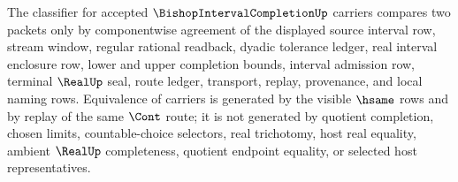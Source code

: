 \begin{definition}
\label{def:bishop-interval-completion-classifier}
The classifier for accepted $\BishopIntervalCompletionUp$ carriers compares two packets only by componentwise agreement of the displayed source interval row, stream window, regular rational readback, dyadic tolerance ledger, real interval enclosure row, lower and upper completion bounds, interval admission row, terminal $\RealUp$ seal, route ledger, transport, replay, provenance, and local naming rows. Equivalence of carriers is generated by the visible $\hsame$ rows and by replay of the same $\Cont$ route; it is not generated by quotient completion, chosen limits, countable-choice selectors, real trichotomy, host real equality, ambient $\RealUp$ completeness, quotient endpoint equality, or selected host representatives.
\end{definition}

